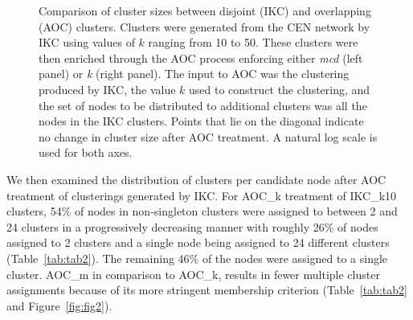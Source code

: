 \documentclass[12pt, oneside]{article}   	%
\begin{document}
\begin{figure}[H]
\begin{subfigure}[t]{0.48\textwidth}
        	\end{subfigure}
\captionsetup{width=0.9\textwidth}	
\caption{Comparison of cluster sizes between disjoint (IKC)  and overlapping (AOC) clusters. Clusters were generated from the CEN network by IKC using values of $k$ ranging from 10 to 50. These clusters were then enriched through the AOC process enforcing either \emph{mcd} (left panel) or \emph{k} (right panel). The input to AOC was the  clustering produced by 
IKC, the value $k$ used to construct the clustering, and the set of nodes to be distributed to additional clusters was all the nodes in the IKC clusters.  Points that lie on the diagonal indicate no change in cluster size after AOC treatment. A natural log scale is used for both axes.}
\label{fig:fig1}
\end{figure}

We then examined the distribution of clusters per candidate node after AOC treatment of clusterings generated by  IKC. For AOC\_k treatment of IKC\_k10 clusters, 54\% of nodes in non-singleton clusters were assigned to between 2 and 24 clusters in a progressively decreasing manner with roughly 26\% of nodes assigned to 2 clusters and a single node being assigned to 24 different clusters (Table~\ref{tab:tab2}). The remaining 46\% of the nodes were assigned to a single cluster. AOC\_m in comparison to AOC\_k, results in fewer multiple cluster assignments because of its more stringent membership criterion (Table~\ref{tab:tab2} and Figure~\ref{fig:fig2}).
\end{document}
